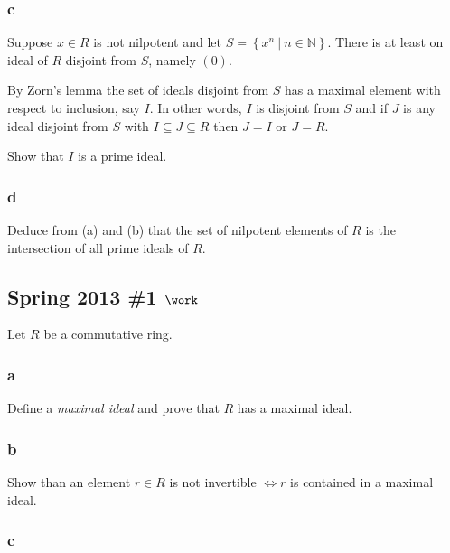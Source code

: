 \hypertarget{c-24}{%
\subsubsection{c}\label{c-24}}

Suppose \(x\in R\) is not nilpotent and let
\(S = \left\{{x^n {~\mathrel{\Big|}~}n\in {\mathbb{N}}}\right\}\). There
is at least on ideal of \(R\) disjoint from \(S\), namely \((0)\).

By Zorn's lemma the set of ideals disjoint from \(S\) has a maximal
element with respect to inclusion, say \(I\). In other words, \(I\) is
disjoint from \(S\) and if \(J\) is any ideal disjoint from \(S\) with
\(I\subseteq J \subseteq R\) then \(J=I\) or \(J=R\).

Show that \(I\) is a prime ideal.

\hypertarget{d-10}{%
\subsubsection{d}\label{d-10}}

Deduce from (a) and (b) that the set of nilpotent elements of \(R\) is
the intersection of all prime ideals of \(R\).

\hypertarget{spring-2013-1-work}{%
\subsection{\texorpdfstring{Spring 2013 \#1
\(\work\)}{Spring 2013 \#1 \textbackslash work}}\label{spring-2013-1-work}}

Let \(R\) be a commutative ring.

\hypertarget{a-48}{%
\subsubsection{a}\label{a-48}}

Define a \emph{maximal ideal} and prove that \(R\) has a maximal ideal.

\hypertarget{b-38}{%
\subsubsection{b}\label{b-38}}

Show than an element \(r\in R\) is not invertible \(\iff r\) is
contained in a maximal ideal.

\hypertarget{c-25}{%
\subsubsection{c}\label{c-25}}

